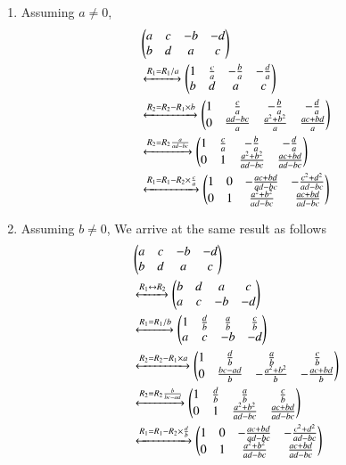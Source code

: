 \documentclass[journal,12pt,twocolumn]{IEEEtran}
\begin{document}
\begin{enumerate}
    \item Assuming $a \neq 0$, 
    \begin{align}
        &\begin{pmatrix}a & c & -b & -d \\ b & d & a & c\end{pmatrix}  \nonumber \\
        &\xleftrightarrow{R_1 = R_1/a} \begin{pmatrix}1 & \frac{c}{a} & -\frac{b}{a} & -\frac{d}{a} \\ b & d & a & c\end{pmatrix} \nonumber \\
&\xleftrightarrow{R_2 = R_2 - R_1\times b} \begin{pmatrix}1 & \frac{c}{a} & -\frac{b}{a} & -\frac{d}{a} \\ 0 & \frac{ad-bc}{a} & \frac{a^2+b^2}{a} & \frac{ac+bd}{a}\end{pmatrix} \nonumber \\
&\xleftrightarrow{R_2 = R_2\frac{a}{ad-bc}} \begin{pmatrix}1 & \frac{c}{a} & -\frac{b}{a} & -\frac{d}{a} \\ 0 & 1 & \frac{a^2+b^2}{ad-bc} & \frac{ac+bd}{ad-bc}\end{pmatrix} \nonumber \\
&\xleftrightarrow{R_1 = R_1 - R_2\times\frac{c}{a}} \begin{pmatrix}1 & 0 & -\frac{ac+bd}{ad-bc} & -\frac{c^2+d^2}{ad-bc} \\ 0 & 1 & \frac{a^2+b^2}{ad-bc} & \frac{ac+bd}{ad-bc}\end{pmatrix} \nonumber
    \end{align}
\item Assuming $b \neq 0$, We arrive at the same result as follows
\begin{align}
    &\begin{pmatrix}a & c & -b & -d \\ b & d & a & c\end{pmatrix} \nonumber \\ 
    &\xleftrightarrow{R_1\leftrightarrow R_2} \begin{pmatrix} b & d & a & c \\ a & c & -b & -d \end{pmatrix} \nonumber \\
&\xleftrightarrow{R_1 = R_1/b}   \begin{pmatrix} 1 & \frac{d}{b} & \frac{a}{b} & \frac{c}{b} \\ a & c & -b & -d \end{pmatrix} \nonumber \\
&\xleftrightarrow{R_2 = R_2 - R_1\times a} \begin{pmatrix} 1 & \frac{d}{b} & \frac{a}{b} & \frac{c}{b} \\ 0 & \frac{bc-ad}{b} & -\frac{a^2+b^2}{b} & -\frac{ac+bd}{b}\end{pmatrix} \nonumber \\
&\xleftrightarrow{R_2 = R_2\frac{b}{bc-ad}} \begin{pmatrix} 1 & \frac{d}{b} & \frac{a}{b} & \frac{c}{b} \\ 0 & 1 & \frac{a^2+b^2}{ad-bc} & \frac{ac+bd}{ad-bc}\end{pmatrix} \nonumber \\
&\xleftrightarrow{R_1 = R_1 - R_2\times\frac{d}{b}} \begin{pmatrix}1 & 0 & -\frac{ac+bd}{ad-bc} & -\frac{c^2+d^2}{ad-bc} \\ 0 & 1 & \frac{a^2+b^2}{ad-bc} & \frac{ac+bd}{ad-bc}\end{pmatrix} \nonumber
\end{align}
\end{enumerate}
\end{document}
